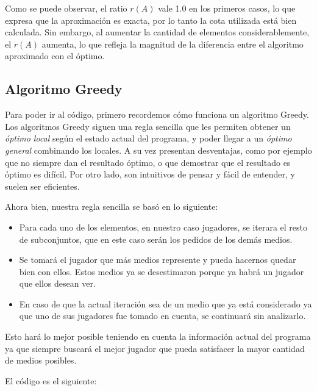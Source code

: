 Como se puede observar, el ratio $r(A)$ vale 1.0 en los primeros casos, lo que expresa que la aproximación es exacta, por lo tanto la cota utilizada está bien calculada. Sin embargo, al aumentar la cantidad de elementos considerablemente, el $r(A)$ aumenta, lo que refleja la magnitud de la diferencia entre el algoritmo aproximado con el óptimo.

\subsection{Algoritmo Greedy}

Para poder ir al código, primero recordemos cómo funciona un algoritmo Greedy. Los algoritmos Greedy siguen una regla sencilla que les permiten obtener un \textit{óptimo local} según el estado actual del programa, y poder llegar a un \textit{óptimo general} combinando los locales. A su vez presentan desventajas, como por ejemplo que no siempre dan el resultado óptimo, o que demostrar que el resultado es óptimo es difícil. Por otro lado, son intuitivos de pensar y fácil de entender, y suelen ser eficientes.

Ahora bien, nuestra regla sencilla se basó en lo siguiente:
\begin{itemize}
    \item Para cada uno de los elementos, en nuestro caso jugadores, se iterara el resto de subconjuntos, que en este caso serán los pedidos de los demás medios.
    \item Se tomará el jugador que más medios represente y pueda hacernos quedar bien con ellos. Estos medios ya se desestimaron porque ya habrá un jugador que ellos desean ver.
    \item En caso de que la actual iteración sea de un medio que ya está considerado ya que uno de sus jugadores fue tomado en cuenta, se continuará sin analizarlo.
\end{itemize}

Esto hará lo mejor posible teniendo en cuenta la información actual del programa ya que siempre buscará el mejor jugador que pueda satisfacer la mayor cantidad de medios posibles.

El código es el siguiente:



